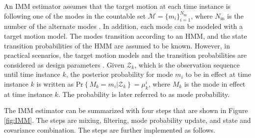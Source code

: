 \documentclass[english, 12pt, a4paper, elec, utf8, a-1b, online]{aaltothesis}
\renewcommand{\Pr}[1]{\text{Pr}\left\{ #1 \right\}}
\newcommand{\modeprob}{\mu_k^i}
\newcommand{\nmodels}{{N_\text{m}}}
\begin{document}
An IMM estimator assumes that the target motion at each time instance is following one of the modes in the countable set $\mathcal{M} = \{ m_i \}_{i=1}^\nmodels$, where $\nmodels$ is the number of the alternate modes \cite{BarShalom2001}.
In addition, each mode can be modeled with a target motion model.
The modes transition according to an HMM, and the state transition probabilities of the HMM are assumed to be known.
However, in practical scenarios, the target motion models and the transition probabilities are considered as design parameters \cite{Simeonova2002}.
Given $\mathcal{Z}_k$, which is the observation sequence until time instance $k$, the posterior probability for mode $m_i$ to be in effect at time instance $k$ is written as $\Pr{M_k=m_i | \mathcal{Z}_k} = \modeprob$, where $M_k$ is the mode in effect at time instance $k$.
The probability is later referred to as mode probability.

The IMM estimator can be summarized with four steps that are shown in Figure \ref{fig:IMM}.
The steps are mixing, filtering, mode probability update, and state and covariance combination. 
The steps are further implemented as follows.
\end{document}
